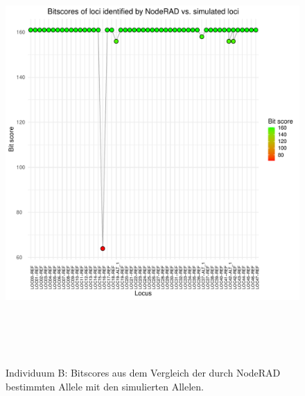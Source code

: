 \begin{figure}[H]
	\begin{center}
		\includegraphics[height=16cm]{bilder/evaluation/bitscores/B.plot_bitscores.pdf}
		\caption{Individuum B: Bitscores aus dem Vergleich der durch NodeRAD bestimmten Allele mit den simulierten Allelen.}
	\end{center}
\end{figure}

